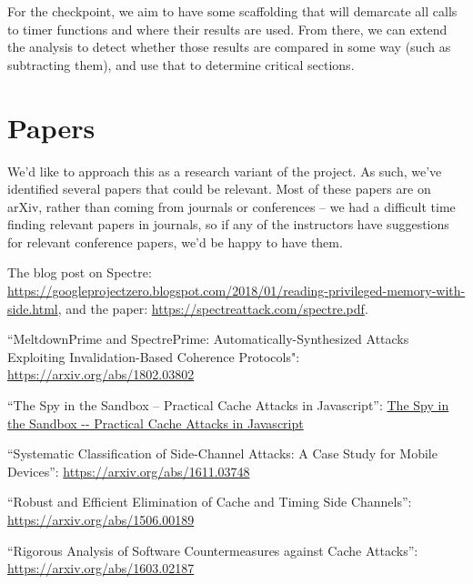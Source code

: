 \documentclass[twocolumn]{article}
\begin{document}
For the checkpoint, we aim to have some scaffolding that will demarcate
all calls to timer functions and where their results are used. From there,
we can extend the analysis to detect whether those results are compared
in some way (such as subtracting them), and use that to determine critical
sections.

\section{Papers}

We'd like to approach this as a research variant of the project. As
such, we've identified several papers that could be relevant. Most of
these papers are on arXiv, rather than coming from journals or
conferences -- we had a difficult time finding relevant papers in
journals, so if any of the instructors have suggestions for relevant
conference papers, we'd be happy to have them.

The blog post on Spectre:
\url{https://googleprojectzero.blogspot.com/2018/01/reading-privileged-memory-with-side.html},
and the paper: \url{https://spectreattack.com/spectre.pdf}.

``MeltdownPrime and SpectrePrime: Automatically-Synthesized Attacks
Exploiting Invalidation-Based Coherence Protocols":
\url{https://arxiv.org/abs/1802.03802}

``The Spy in the Sandbox -- Practical Cache Attacks in Javascript'':
\url{The Spy in the Sandbox -- Practical Cache Attacks in Javascript}

``Systematic Classification of Side-Channel Attacks: A Case Study for
Mobile Devices'': \url{https://arxiv.org/abs/1611.03748}

``Robust and Efficient Elimination of Cache and Timing Side
Channels'': \url{https://arxiv.org/abs/1506.00189}

``Rigorous Analysis of Software Countermeasures against Cache Attacks'': \url{https://arxiv.org/abs/1603.02187}
\end{document}
